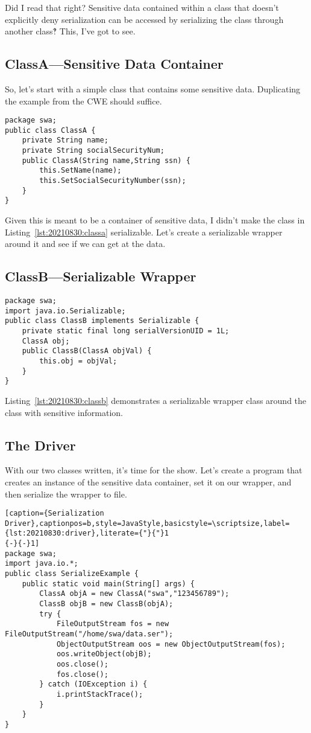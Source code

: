 Did I read that right? Sensitive data contained within a class that doesn't explicitly deny serialization can be accessed by serializing the class through another class‽ This, I've got to see.

\subsection{ClassA---Sensitive Data Container}
So, let's start with a simple class that contains some sensitive data. Duplicating the example from the CWE should suffice.
\begin{lstlisting}[caption={ClassA},captionpos=b,style=JavaStyle,label={lst:20210830:classa}]
package swa;
public class ClassA {
	private String name;
	private String socialSecurityNum;
	public ClassA(String name,String ssn) {
		this.SetName(name);
		this.SetSocialSecurityNumber(ssn);
	}
}
\end{lstlisting}

Given this is meant to be a container of sensitive data, I didn't make the class in Listing~\ref{lst:20210830:classa} serializable. Let's create a serializable wrapper around it and see if we can get at the data.

\subsection{ClassB---Serializable Wrapper}

\begin{lstlisting}[caption={ClassB},captionpos=b,style=JavaStyle,label={lst:20210830:classb}]
package swa;
import java.io.Serializable;
public class ClassB implements Serializable {
	private static final long serialVersionUID = 1L;
	ClassA obj;
	public ClassB(ClassA objVal) {
		this.obj = objVal;
	}
}
\end{lstlisting}

Listing~\ref{lst:20210830:classb} demonstrates a serializable wrapper class around the class with sensitive information.

\subsection{The Driver}
With our two classes written, it's time for the show. Let's create a program that creates an instance of the sensitive data container, set it on our wrapper, and then serialize the wrapper to file.

\begin{lstlisting}[caption={Serialization Driver},captionpos=b,style=JavaStyle,basicstyle=\scriptsize,label={lst:20210830:driver},literate={"}{"}1
{-}{-}1]
package swa;
import java.io.*;
public class SerializeExample {
	public static void main(String[] args) {
		ClassA objA = new ClassA("swa","123456789");
		ClassB objB = new ClassB(objA);
		try {
			FileOutputStream fos = new FileOutputStream("/home/swa/data.ser");
			ObjectOutputStream oos = new ObjectOutputStream(fos);
			oos.writeObject(objB);
			oos.close();
			fos.close();
		} catch (IOException i) {
			i.printStackTrace();
		}
	}
}
\end{lstlisting}

